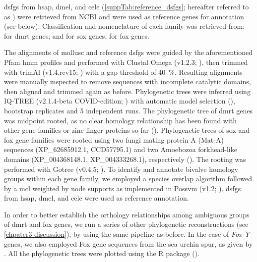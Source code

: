 \glspl{dsfg} from \gls{hsap}, \gls{dmel}, and \gls{cele} (\cref{suppTab:reference_dsfgs}; hereafter referred to as ) were retrieved from NCBI and were used as reference genes for annotation (see below). Classification and nomenclature of each family was retrieved from:  for \gls{dmrt} genes;  and  for \gls{sox} genes;  for \gls{fox} genes.

The alignments of mollusc and reference \glspl{dsfg} were guided by the aforementioned Pfam \gls{hmm} profiles and performed with Clustal Omega (v1.2.3; ), then trimmed with trimAl (v1.4.rev15; ) with a gap threshold of \qty{40}{\percent}. Resulting alignments were manually inspected to remove sequences with incomplete catalytic domains, then aligned and trimmed again as before. Phylogenetic trees were inferred using IQ-TREE (v2.1.4-beta COVID-edition; ) with automatic model selection (),  bootstrap replicates and 5 independent runs. The phylogenetic tree of \gls{dmrt} genes was midpoint rooted, as no clear homology relationship has been found with other gene families or zinc-finger proteins so far (). Phylogenetic trees of \gls{sox} and \gls{fox} gene families were rooted using two fungi mating protein A (Mat-A) sequences (XP\_62685912.1, CCD57795.1) and two Amoebozoa forkhead-like domains (XP\_004368148.1, XP\_004333268.1), respectively (). The rooting was performed with Gotree (v0.4.5; ). To identify and annotate bivalve homology groups within each gene family, we employed a species overlap algorithm followed by a \gls{mcl} weighted by node supports as implemented in Possvm (v1.2; ). \glspl{dsfg} from \gls{hsap}, \gls{dmel}, and \gls{cele} were used as reference annotation.

In order to better establish the orthology relationships among ambiguous groups of \gls{dmrt} and \gls{fox} genes, we run a series of other phylogenetic reconstructions (see \cref{chpater3-discussion}), by using the same pipeline as before. In the case of \textit{Fox-Y} genes, we also employed Fox gene sequences from the sea urchin \gls{spur}, as given by . All the phylogenetic trees were plotted using the R package  ().

